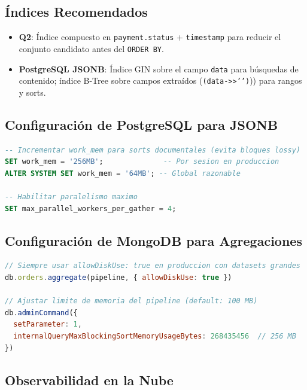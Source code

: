 \documentclass[12pt,a4paper]{article}
\begin{document}
\subsection{Índices Recomendados}

\begin{itemize}
  \item \textbf{Q2}: Índice compuesto en \texttt{payment.status} + \texttt{timestamp} para reducir el conjunto candidato antes del \texttt{ORDER BY}.
  \item \textbf{PostgreSQL JSONB}: Índice GIN sobre el campo \texttt{data} para búsquedas de contenido; índice B-Tree sobre campos extraídos (\texttt{(data->>'{}')})\allowbreak) para rangos y sorts.
\end{itemize}

\subsection{Configuración de PostgreSQL para JSONB}

\begin{lstlisting}[language=SQL, caption={Parámetros recomendados para PostgreSQL con cargas JSONB}]
-- Incrementar work_mem para sorts documentales (evita bloques lossy)
SET work_mem = '256MB';              -- Por sesion en produccion
ALTER SYSTEM SET work_mem = '64MB'; -- Global razonable

-- Habilitar paralelismo maximo
SET max_parallel_workers_per_gather = 4;
\end{lstlisting}

\subsection{Configuración de MongoDB para Agregaciones}

\begin{lstlisting}[language=JavaScript, caption={Parámetros recomendados para MongoDB con pipelines grandes}]
// Siempre usar allowDiskUse: true en produccion con datasets grandes
db.orders.aggregate(pipeline, { allowDiskUse: true })

// Ajustar limite de memoria del pipeline (default: 100 MB)
db.adminCommand({
  setParameter: 1,
  internalQueryMaxBlockingSortMemoryUsageBytes: 268435456  // 256 MB
})
\end{lstlisting}

\subsection{Observabilidad en la Nube}
\end{document}
